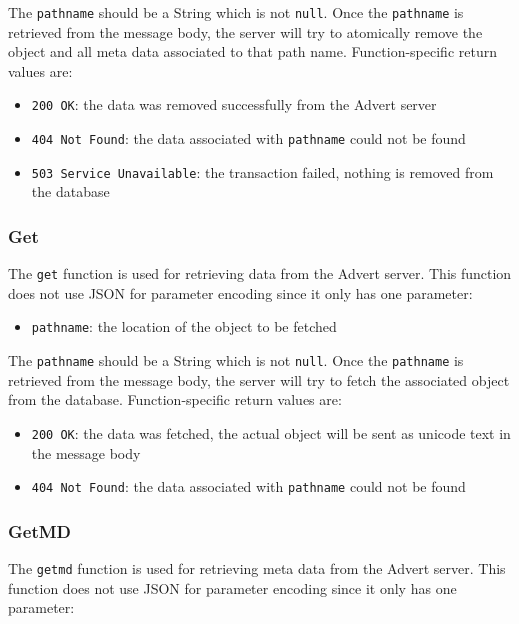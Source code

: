 The \texttt{pathname} should be a String which is not \texttt{null}. Once the
\texttt{pathname} is retrieved from the message body, the server will try to
atomically remove the object and all meta data associated to that path name.
Function-specific return values are:

\begin{itemize}
  \item \texttt{200 OK}: the data was removed successfully from the Advert
  server
  \item \texttt{404 Not Found}: the data associated with \texttt{pathname}
  could not be found
  \item \texttt{503 Service Unavailable}: the transaction failed, nothing is
  removed from the database
\end{itemize}

\subsubsection{Get}
\label{get}
The \texttt{get} function is used for retrieving data from the Advert server.
This function does not use JSON for parameter encoding since it only has one
parameter:

\begin{itemize}
  \item \texttt{pathname}: the location of the object to be fetched
\end{itemize}

The \texttt{pathname} should be a String which is not \texttt{null}. Once the
\texttt{pathname} is retrieved from the message body, the server will try to
fetch the associated object from the database. Function-specific return values
are:

\begin{itemize}
  \item \texttt{200 OK}: the data was fetched, the actual object will be sent
  as unicode text in the message body
  \item \texttt{404 Not Found}: the data associated with \texttt{pathname}
  could not be found
\end{itemize}

\subsubsection{GetMD}
\label{getmd}
The \texttt{getmd} function is used for retrieving meta data from the Advert
server. This function does not use JSON for parameter encoding since it only has
one
parameter:

